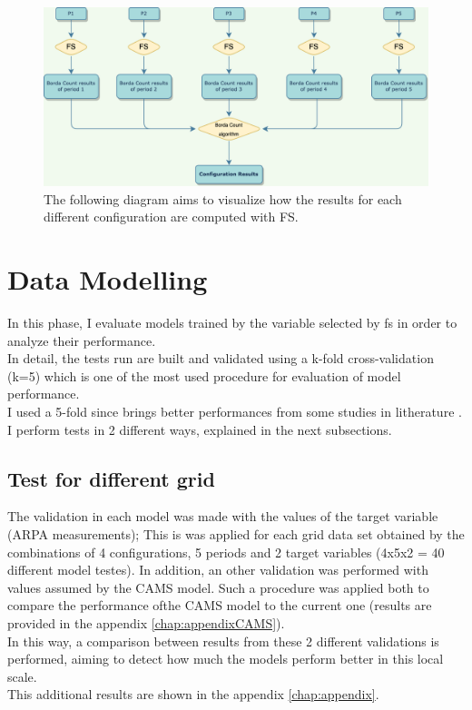 \begin{figure}[H]
    \centering
    \includegraphics[width=.9\textwidth]{images/overview_results_configuration.png}
    \caption{The following diagram aims to visualize how the results for each different configuration are computed with FS.}
    \label{fig:overview_configuration}
\end{figure}

\pagebreak
\section{Data Modelling}
\label{sec:modelling}
In this phase, I evaluate models trained by the variable selected by \acrshort{fs} in order to analyze their performance.\\
In detail, the tests run are built and validated using a k-fold cross-validation (k=5) which is one of the most used procedure for evaluation of model performance.\\
I used a 5-fold since brings better performances from some studies in litherature  \cite{anguita2005k} \cite{jung2020evaluation}.
I perform tests in 2 different ways, explained in the next subsections.
\subsection{Test for different grid}
The validation in each model was made with the values of the target variable (ARPA measurements);
This is was applied for each grid data set obtained by the combinations of 4 configurations, 5 periods and 2 target variables (4x5x2 = 40 different model testes). 
In addition, an other validation was performed with values assumed by the CAMS model.
Such a procedure was applied both to compare the performance ofthe CAMS model to the current one (results are provided in the appendix \ref{chap:appendixCAMS}).\\
In this way, a comparison between results from these 2 different validations is performed, aiming to detect how much the models perform better in this local scale.\\
This additional results are shown in the appendix \ref{chap:appendix}. 

